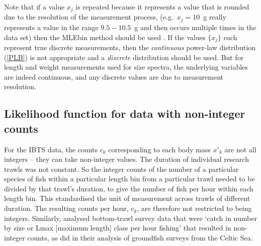 \documentclass[12pt, letter]{article}
\newcommand{\MEE}{erpbb17}     %
\begin{document}
Note that if a value $x_j$ is repeated because it represents a value that is
rounded due to the resolution of the measurement process, (e.g.~$x_j = 10$~g
really represents a value in the range $9.5-10.5$~g and then occurs multiple
times in the data set) then the MLEbin method should be used \citep{\MEE}. If
the values $\{ x_j \}$ each represent true discrete measurements, then the
\emph{continuous} power-law distribution (\ref{PLB}) is not appropriate and a
\emph{discrete} distribution should be used. But for
length and weight measurements used for size spectra, the underlying variables
are indeed continuous, and any discrete values are due to measurement
resolution.

\subsection{Likelihood function for data with non-integer counts\label{sec:likeNonInt}}


For the IBTS data, the counts $c_k$ corresponding to each body mass $x'_k$ are
not all integers -- they can take non-integer values. The duration of individual
research trawls was not constant. So the integer counts of the number of a
particular species of fish within a particular length bin from a particular
trawl needed to be divided by that trawl's duration, to give the number of fish
per hour within each length bin. This standardised the unit of measurement
across trawls of different duration. The resulting counts per hour, $c_k$, are
therefore not restricted to being integers. Similarly, \citet{dgpr05} analysed
bottom-trawl survey data that were `catch in number by size or Lmax [maximum
  length] class per hour fishing' that resulted in non-integer counts, as did
\citet{blan05} in their analysis of groundfish surveys from the Celtic Sea.
\end{document}
